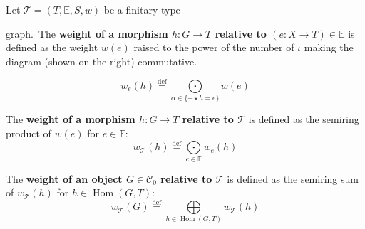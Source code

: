    
   \begin{definition} 
       \label{def:weight}
       Let $\mathcal{T} = (T,\mathbb{E},S, w)$ be a finitary type
       \newline
       \noindent
       \begin{minipage}{0.6\textwidth}graph.~The \textbf{weight of a morphism $h: G \rightarrow T$ relative to $(e:X \to T) \in \mathbb{E}$} is defined as the weight $w(e)$ raised to the power of the number of $\iota$ making the diagram (shown on the right) commutative.
       \end{minipage}
       \begin{minipage}{0.29\textwidth}
           \begin{center}
           \end{center} 
       \end{minipage}
                   \[
                   w_e(h) 
                       \overset{\operatorname{def}}{=}
                   \underset{\alpha \in \{- \star h = e\}}{\bigodot}w(e) 
                   \]
   
           \noindent
           The \textbf{weight of a morphism $h: G \rightarrow T$ relative to \(\mathcal{T}\)} is defined as the semiring product of $w(e)$ for $e \in \mathbb{E}$:
           \[  w_\mathcal{T}(h) \overset{\operatorname{def}}{=} \underset{e \in \mathbb{E}}{\bigodot} 
                   w_e(h) \]
   
           \noindent
          The \textbf{weight of an object \( G \in \mathcal{C}_0 \) relative to \( \mathcal{T}\)} is defined as the semiring sum of $w_\mathcal{T}(h)$ for $h \in \operatorname{Hom}(G,T)$:
           \[w_\mathcal{T}(G) \overset{\operatorname{def}}{=} \underset{h \in \operatorname{Hom}(G,T)}{\bigoplus}  w_\mathcal{T}(h) \]
   \end{definition}
   
